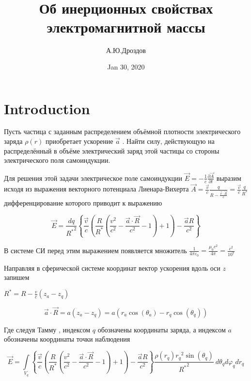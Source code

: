 \documentclass{article}
\begin{document}
\title{Об инерционных свойствах электромагнитной массы}

\author{А.Ю.Дроздов}

\date{Jan 30, 2020}



\section{Introduction}



Пусть частица с заданным распределением объёмной плотности электрического заряда $\rho \left( r \right)$ приобретает ускорение $\overrightarrow{a}$ . Найти силу, действующую на распределённый в объёме электрический заряд этой частицы со стороны электрического поля самоиндукции.

Для решения этой задачи электрическое поле самоиндукции $\overrightarrow{E}=-\frac{1}{c}\frac{\partial \overrightarrow{A}}{\partial t}$
выразим исходя из выражения векторного потенциала Лиенара-Вихерта \cite{LL2} $\overrightarrow{A}=\frac{\overrightarrow{v}}{c}\frac{q}{R-\frac{\overrightarrow{v}\cdot \overrightarrow{R}}{c}}=\frac{\overrightarrow{v}}{c}\frac{q}{{{R}^{*}}}$ дифференцирование которого приводит к выражению \cite{rustot}

\[\overrightarrow{E}=\frac{dq}{{{R}^{*}}^{2}}\left\{ \frac{\overrightarrow{v}}{c}\left( \frac{R}{{{R}^{*}}}\left( \frac{{{v}^{2}}}{{{c}^{2}}}-\frac{\overrightarrow{a}\cdot \overrightarrow{R}}{{{c}^{2}}}-1 \right)+1 \right)-\frac{\overrightarrow{a}R}{{{c}^{2}}} \right\}\]

В системе СИ перед этим выражением появляется множитель $\frac{1}{4\pi {{\varepsilon }_{0}}}=\frac{{{\mu }_{0}}{{c}^{2}}}{4\pi }=\frac{{{c}^{2}}}{{{10}^{7}}}$

Направляя в сферической системе координат вектор ускорения вдоль оси $z$  запишем

${{R}^{*}}=R-\frac{v}{c}\left( {{z}_{a}}-{{z}_{q}} \right)$

\[\overrightarrow{a}\cdot \overrightarrow{R}=a\left( {{z}_{a}}-{{z}_{q}} \right)=a\left( {{r}_{a}}\cos \left( {{\theta }_{a}} \right)-{{r}_{q}}\cos \left( {{\theta }_{q}} \right) \right)\]

Где следуя Тамму \cite{tamm}, индексом $q$ обозначены координаты заряда, а индексом $a$ обозначены координаты точки наблюдения

\[\overrightarrow{E}=\int\limits_{{{V}_{q}}}{\left\{ \frac{\overrightarrow{v}}{c}\left( \frac{R}{{{R}^{*}}}\left( \frac{{{v}^{2}}}{{{c}^{2}}}-\frac{\overrightarrow{a}\cdot \overrightarrow{R}}{{{c}^{2}}}-1 \right)+1 \right)-\frac{\overrightarrow{a}R}{{{c}^{2}}} \right\}\frac{\rho \left( {{r}_{q}} \right){{r}_{q}}^{2}\sin \left( {{\theta }_{q}} \right)}{{{R}^{*}}^{2}}\ }d{{\theta }_{q}}d{{\varphi }_{q}}d{{r}_{q}}\]
\end{document}
